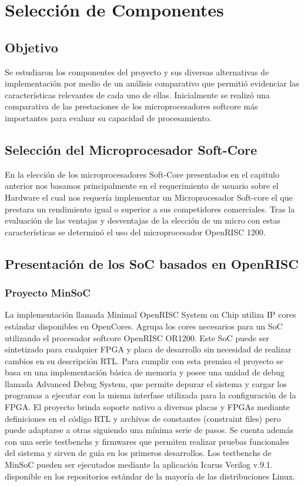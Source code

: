 \chapter{Selección de Componentes}

\section{Objetivo}
			Se estudiaron los componentes del proyecto y sus diversas alternativas de implementación por medio de un análisis comparativo que permitió evidenciar
			las características relevantes de cada uno de ellas. Inicialmente se realizó una comparativa de las prestaciones de los microprocesadores softcore
			más importantes para evaluar su capacidad de procesamiento.

\section{Selección del Microprocesador Soft-Core}

En la elección de los microprocesadores Soft-Core presentados en el capitulo anterior nos basamos principalmente en el requerimiento de usuario sobre el Hardware el cual nos requería implementar un Microprocesador Soft-core el que prestara un rendimiento igual o superior a sus competidores comerciales. Tras la evaluación de las ventajas y desventajas de la elección de un micro con estas características se determinó el uso del microprocesador OpenRISC 1200. 	


\section{Presentación de los SoC basados en OpenRISC}
				
				\subsection{Proyecto MinSoC}
				La implementación llamada Minimal OpenRISC System on Chip utiliza IP cores estándar disponibles en OpenCores. Agrupa los cores necesarios para un SoC utilizando el procesador softcore OpenRISC OR1200. Este SoC puede ser sintetizado para cualquier FPGA y placa de desarrollo sin necesidad de realizar cambios en su descripción RTL. Para cumplir con esta premisa el proyecto se basa en una implementación básica de memoria y posee una unidad de debug llamada Advanced Debug System, que permite depurar el sistema y cargar los programas a ejecutar con la misma interfase utilizada para la configuración de la FPGA.				El proyecto brinda soporte nativo a diversas placas y FPGAs mediante definiciones en el código RTL y archivos de constantes (constraint files)
				pero puede adaptarse a otras siguiendo una mínima serie de pasos. Se cuenta además con una serie testbenchs y firmwares que permiten realizar
				pruebas funcionales del sistema y sirven de guía en los primeros desarrollos. Los testbenchs de MinSoC pueden ser ejecutados mediante la
				aplicación Icarus Verilog v.9.1. disponible en los repositorios estándar de la mayoría de las distribuciones Linux. 
				
